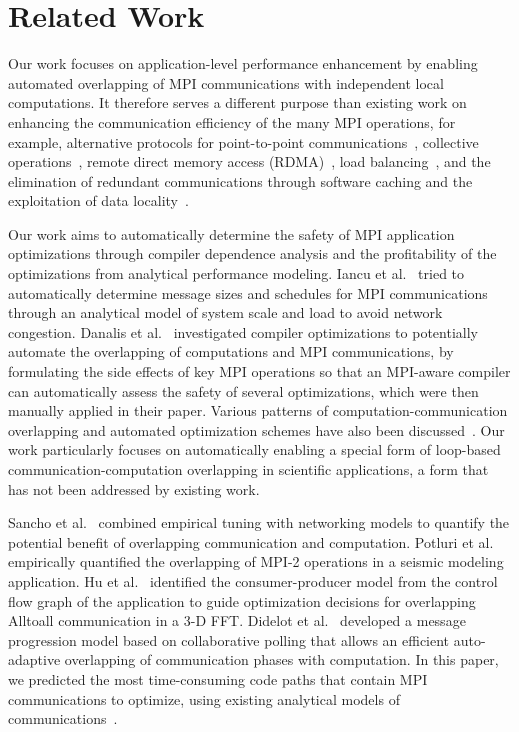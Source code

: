 \section{Related Work}
\label{sec-related}

Our work focuses on application-level performance
enhancement by enabling automated overlapping of MPI communications
with independent local computations. It therefore serves a different purpose than
existing work on enhancing the communication efficiency of the many 
MPI operations, for example, alternative protocols for point-to-point
communications~\cite{brightwell:eurompi03,denis:eurompi11}, collective
operations~\cite{traff:eurompi14:ocd,traff:eurompi14:mcd,graham:eurompi08,mittal:ppopp12},
remote direct memory access
(RDMA)~\cite{liu:ics03,woodall:eurompi06,hatanaka:eurompi13}, load
balancing~\cite{nian:niss09,kale:eurompi14}, and the
elimination of redundant communications through software caching and
the exploitation of data
locality~\cite{buntinas:icpp09,isujita:eurompi14,ozog:ics13}.  

Our work aims to automatically determine the safety of MPI application optimizations through compiler 
dependence analysis and the profitability of the optimizations from 
analytical performance modeling. 
Iancu et al.~\cite{iancu:ppopp07} tried to automatically determine
message sizes and schedules for MPI communications through an
analytical model of system scale and load to avoid network congestion.
Danalis et al.~\cite{danalis:ics09} investigated compiler
optimizations to potentially automate the overlapping of 
computations and MPI communications, by formulating the side effects of key MPI operations so that
an MPI-aware compiler can automatically assess the safety of several
optimizations, which were then manually applied in their paper.
Various patterns of computation-communication overlapping and
automated optimization schemes have also been
discussed~\cite{danalis:sc05,fishgold:ipdps06}.  
Our work particularly focuses on automatically enabling 
a special form of loop-based
communication-computation overlapping in scientific applications, a form that has not been addressed
by existing work. 

Sancho et al.~\cite{sancho:sc06} combined empirical tuning with
networking models to quantify the potential benefit of overlapping
communication and computation.
Potluri et al.~\cite{potluri:ics10} empirically quantified the
overlapping of MPI-2 operations in a seismic modeling application.  Hu
et al.~\cite{hu:npc08,song:ppopp14} identified the consumer-producer
model from the control flow graph of the application to guide
optimization decisions for overlapping Alltoall communication in a 3-D
FFT.  Didelot et al.~\cite{didelot:imc14,didelot:eurompi12} developed
a message progression model based on collaborative polling that allows
an efficient auto-adaptive overlapping of communication phases with
computation.  In this paper, we predicted the most time-consuming
code paths that contain MPI communications to
optimize, using existing analytical models of
communications~\cite{loggp}.

